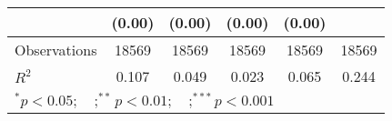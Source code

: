 \begin{table}[htbp]
\begin{tabular}{l*{5}{c}}
                    &      (0.00)         &      (0.00)         &      (0.00)         &      (0.00)         &                     \\
\midrule
Observations        &       18569         &       18569         &       18569         &       18569         &       18569         \\
\(R^{2}\)           &       0.107         &       0.049         &       0.023         &       0.065         &       0.244         \\
\bottomrule
\multicolumn{6}{l}{\footnotesize $^{*}p<0.05; \quad ; ^{**} p<0.01; \quad ; ^{***}p<0.001$}\\
\end{tabular}
\end{table}
